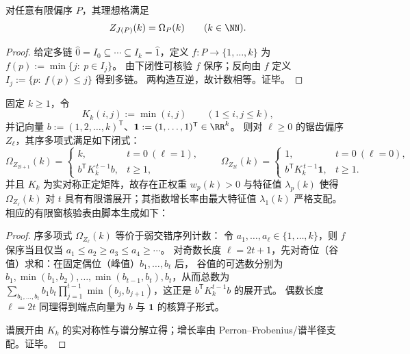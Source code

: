 \begin{theorem}\label{thm:pom-zeta-equals-order-poly}
对任意有限偏序 \(P\)，其理想格满足
\[
Z_{J(P)}(k)=\Omega_P(k)\qquad(k\in\NN).
\]
\end{theorem}
\begin{proof}
给定多链 \(\hat0=I_0\subseteq\cdots\subseteq I_k=\hat1\)，定义 \(f:P\to\{1,\dots,k\}\) 为
\(
f(p):=\min\{j:\ p\in I_j\}
\)。
由下闭性可核验 \(f\) 保序；反向由 \(f\) 定义 \(I_j:=\{p:\ f(p)\le j\}\) 得到多链。
两构造互逆，故计数相等。证毕。
\end{proof}

\begin{theorem}[锯齿序多项式的核算子表示与谱展开]\label{thm:pom-fence-order-poly-spectral}
固定 \(k\ge 1\)，令
\[
K_k(i,j):=\min(i,j)\qquad(1\le i,j\le k),
\]
并记向量 \(b:=(1,2,\dots,k)^{\mathsf T}\)、\(\mathbf 1:=(1,\dots,1)^{\mathsf T}\in\RR^k\)。
则对 \(\ell\ge 0\) 的锯齿偏序 \(Z_\ell\)，其序多项式满足如下闭式：
\[
\Omega_{Z_{2t+1}}(k)=
\begin{cases}
k,& t=0\ (\ell=1),\\
b^{\mathsf T}K_k^{\,t-1}b,& t\ge 1,
\end{cases}
\qquad
\Omega_{Z_{2t}}(k)=
\begin{cases}
1,& t=0\ (\ell=0),\\
b^{\mathsf T}K_k^{\,t-1}\mathbf 1,& t\ge 1.
\end{cases}
\]
并且 \(K_k\) 为实对称正定矩阵，故存在正权重 \(w_p(k)>0\) 与特征值 \(\lambda_p(k)\) 使得
\(\Omega_{Z_\ell}(k)\) 对 \(t\) 具有有限谱展开；其指数增长率由最大特征值 \(\lambda_1(k)\) 严格支配。
相应的有限窗核验表由脚本生成如下：

\end{theorem}
\begin{proof}
序多项式 \(\Omega_{Z_\ell}(k)\) 等价于弱交错序列计数：
令 \(a_1,\dots,a_\ell\in\{1,\dots,k\}\)，则 \(f\) 保序当且仅当
\(
a_1\le a_2\ge a_3\le a_4\ge\cdots
\)。
对奇数长度 \(\ell=2t+1\)，先对奇位（谷值）求和：在固定偶位（峰值）\(b_1,\dots,b_t\) 后，
谷值的可选数分别为 \(b_1,\min(b_1,b_2),\dots,\min(b_{t-1},b_t),b_t\)，从而总数为
\(\sum_{b_1,\dots,b_t} b_1b_t\prod_{j=1}^{t-1}\min(b_j,b_{j+1})\)，这正是 \(b^{\mathsf T}K_k^{t-1}b\) 的展开式。
偶数长度 \(\ell=2t\) 同理得到端点向量为 \(b\) 与 \(\mathbf 1\) 的核算子形式。
\par
谱展开由 \(K_k\) 的实对称性与谱分解立得；增长率由 Perron--Frobenius/谱半径支配。证毕。
\end{proof}

